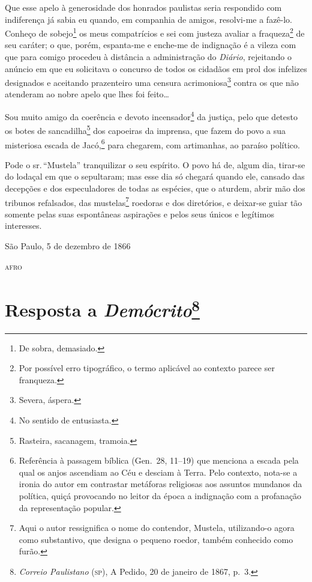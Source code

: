 Que esse apelo à generosidade dos honrados paulistas seria respondido
com indiferença já sabia eu quando, em companhia de amigos, resolvi-me a
fazê-lo. Conheço de sobejo\footnote{De sobra, demasiado.} os meus
compatrícios e sei com justeza avaliar a fraqueza\footnote{Por
  possível erro tipográfico, o termo aplicável ao contexto parece ser
  franqueza.} de seu caráter; o que, porém, espanta-me e enche-me de
indignação é a vileza com que para comigo procedeu à distância a
administração do \emph{Diário}, rejeitando o anúncio em que eu
solicitava o concurso de todos os cidadãos em prol dos infelizes
designados e aceitando prazenteiro uma censura acrimoniosa\footnote{
  Severa, áspera.} contra os que não atenderam ao nobre apelo que lhes
foi feito\ldots{}

Sou muito amigo da coerência e devoto incensador\footnote{No sentido
  de entusiasta.} da justiça, pelo que detesto os botes de
sancadilha\footnote{Rasteira, sacanagem, tramoia.} dos capoeiras da
imprensa, que fazem do povo a sua misteriosa escada de Jacó,\footnote{
  Referência à passagem bíblica (Gen.~28, 11--19) que menciona a escada
  pela qual os anjos ascendiam ao Céu e desciam à Terra. Pelo contexto,
  nota-se a ironia do autor em contrastar metáforas religiosas aos
  assuntos mundanos da política, quiçá provocando no leitor da época a
  indignação com a profanação da representação popular.} para chegarem,
com artimanhas, ao paraíso político.

Pode o sr.\,``Mustela'' tranquilizar o seu espírito. O povo há de, algum
dia, tirar-se do lodaçal em que o sepultaram; mas esse dia só chegará
quando ele, cansado das decepções e dos especuladores de todas as
espécies, que o aturdem, abrir mão dos tribunos refalsados, das
mustelas\footnote{Aqui o autor ressignifica o nome do contendor,
  Mustela, utilizando-o agora como substantivo, que designa o pequeno
  roedor, também conhecido como furão.} roedoras e dos diretórios, e
deixar-se guiar tão somente pelas suas espontâneas aspirações e pelos
seus únicos e legítimos interesses.

\begin{flushright}
São Paulo, 5 de dezembro de 1866

\textsc{afro}
\end{flushright}

\chapter{Resposta a \emph{Demócrito}\footnote{\emph{Correio
  Paulistano} (\textsc{sp}), A Pedido, 20 de janeiro de 1867, p.~3.}}

